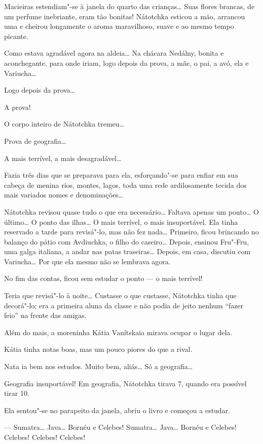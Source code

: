 Macieiras estendiam"-se à janela do quarto das crianças\ldots{} Suas flores
brancas, de um perfume inebriante, eram tão bonitas! Nátotchka esticou a
mão, arrancou uma e cheirou longamente o aroma maravilhoso, suave e ao
mesmo tempo picante.

Como estava agradável agora na aldeia\ldots{} Na chácara Nedálny, bonita e
aconchegante, para onde iriam, logo depois da prova, a mãe, o pai, a
avó, ela e Variucha\ldots{}

Logo depois da prova\ldots{}

A prova!

O corpo inteiro de Nátotchka tremeu\ldots{}

Prova de geografia\ldots{}

A mais terrível, a mais desagradável\ldots{}

Fazia três dias que se preparava para ela, esforçando"-se para enfiar em
sua cabeça de menina rios, montes, lagos, toda uma rede ardilosamente
tecida dos mais variados nomes e denominações\ldots{}


Nátotchka revisou quase tudo o que era necessário\ldots{} Faltava apenas um
ponto\ldots{} O último\ldots{} O ponto das ilhas\ldots{} O mais terrível, o mais
insuportável. Ela tinha reservado a tarde para revisá"-lo, mas não fez
nada\ldots{} Primeiro, ficou brincando no balanço do pátio com Avdiuchka, o
filho do caseiro\ldots{} Depois, ensinou Fru"-Fru, uma galga italiana, a andar
nas patas traseiras\ldots{} Depois, em casa, discutiu com Variucha\ldots{}
Por que ela mesmo não se lembrava agora.

No fim das contas, ficou sem estudar o ponto --- o mais terrível!

Teria que revisá"-lo à noite\ldots{} Custasse o que custasse, Nátotchka tinha
que decorá"-lo; era a primeira aluna da classe e não podia de jeito
nenhum ``fazer feio'' na frente das amigas.

Além do mais, a moreninha Kátia Vanítskaia mirava ocupar o lugar dela.

Kátia tinha notas boas, mas um pouco piores do que a rival.

Nata ia bem nos estudos. Muito bem, aliás\ldots{} Só a geografia\ldots{}

Geografia insuportável! Em geografia, Nátotchka tirava 7, quando era
possível tirar 10.

Ela sentou"-se no parapeito da janela, abriu o livro e começou a estudar.

--- Sumatra\ldots{} Java\ldots{} Bornéu e Celebes! Sumatra\ldots{} Java\ldots{} Bornéu e
Celebes! Celebes! Celebes! Celebes!

